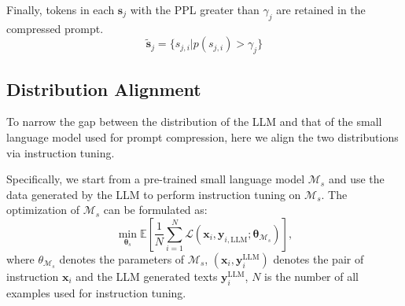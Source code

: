 Finally, tokens in each $\bm{s}_j$ with the PPL greater than $\gamma_j$ are retained in the compressed prompt.
\begin{equation}
    \bm{\widetilde{s}}_j = \{s_{j,i}|p(s_{j,i}) > \gamma_j\}
    \label{eq:compression_threshold}
\end{equation}

\subsection{Distribution Alignment}
To narrow the gap between the distribution of the LLM and that of the small language model used for prompt compression, here we align the two distributions via instruction tuning.

Specifically, we start from a pre-trained small language model $\mathcal{M}_s$ and use the data generated by the LLM to perform instruction tuning on $\mathcal{M}_s$.
The optimization of $\mathcal{M}_s$ can be formulated as:
\begin{equation}
    \min_{\bm{\theta}_{s}} \mathbb{E}\left[\frac{1}{N} \sum_{i=1}^N \mathcal{L}\left(\mathbf{x}_i, \mathbf{y}_{i,\text{LLM}} ; \bm{\theta}_{\mathcal{M}_s} \right)\right],
\end{equation}
where $\theta_{\mathcal{M}_s}$ denotes the parameters of $\mathcal{M}_s$, $(\bm{x}_i, \bm{y}_i^{\text{LLM}})$ denotes the pair of instruction $\bm{x}_i$ and the LLM generated texts $\bm{y}_i^{\text{LLM}}$, $N$ is the number of all examples used for instruction tuning.



